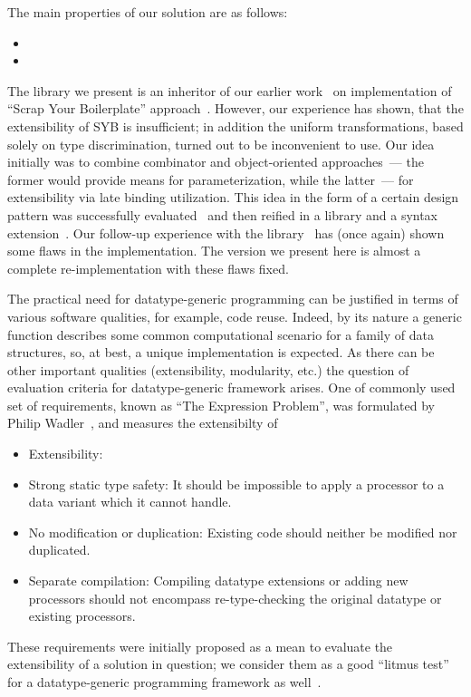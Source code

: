 The main properties of our solution are as follows:

\begin{itemize}
\item 
\item
\end{itemize}


The library we present is an inheritor of our earlier work~\cite{SYBOCaml} on implementation of ``Scrap Your Boilerplate'' approach~\cite{SYB,SYB1,SYB2}. However,
our experience has shown, that the extensibility of SYB is insufficient; in addition the uniform transformations, based solely on type discrimination, turned out to be
inconvenient to use. Our idea initially was to combine combinator and object-oriented approaches~--- the former would provide means for parameterization, while the
latter~--- for extensibility via late binding utilization. This idea in the form of a certain design pattern was successfully evaluated~\cite{SCICO} and then reified
in a library and a syntax extension~\cite{TransformationObjects}. Our follow-up experience with the library~\cite{OCanren} has (once again) shown some flaws in the
implementation. The version we present here is almost a complete re-implementation with these flaws fixed.

The practical need for datatype-generic programming can be justified in terms of various software qualities, for example, code reuse. Indeed, by its nature
a generic function describes some common computational scenario for a family of data structures, so, at best, a unique implementation is expected. As there can be
other important qualities (extensibility, modularity, etc.) the question of evaluation criteria for datatype-generic framework arises. One of commonly used set
of requirements, known as ``The Expression Problem'', was formulated by Philip Wadler~\cite{ExpressionProblem}, and measures the extensibilty of 

\begin{itemize}
\item Extensibility: 
\item Strong static type safety: It should be impossible to
apply a processor to a data variant which it cannot
handle.
\item No modification or duplication: Existing code should
neither be modified nor duplicated.
\item Separate compilation: Compiling datatype extensions or adding new processors should not encompass re-type-checking the original datatype or existing processors.
\end{itemize}

These requirements were initially proposed as a mean to evaluate the extensibility of a solution in question; we consider them as a good ``litmus test'' for
a datatype-generic programming framework as well~\cite{ObjectAlgebras}.
